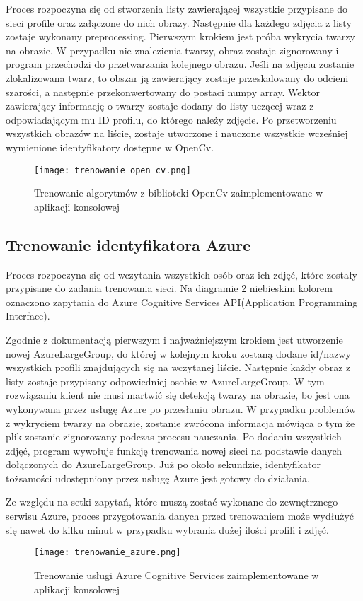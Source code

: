 Proces rozpoczyna się od stworzenia listy zawierającej wszystkie przypisane do sieci profile oraz załączone do nich obrazy. Następnie dla każdego zdjęcia z listy zostaje wykonany preprocessing. Pierwszym krokiem jest próba wykrycia twarzy na obrazie. W przypadku nie znalezienia twarzy, obraz zostaje zignorowany i program przechodzi do przetwarzania kolejnego obrazu. Jeśli na zdjęciu zostanie zlokalizowana twarz, to obszar ją zawierający zostaje przeskalowany do odcieni szarości, a następnie przekonwertowany do postaci numpy array. Wektor zawierający informację o twarzy zostaje dodany do listy uczącej wraz z odpowiadającym mu ID profilu, do którego należy zdjęcie. Po przetworzeniu wszystkich obrazów na liście, zostaje utworzone i nauczone wszystkie wcześniej wymienione identyfikatory dostępne w OpenCv.
\begin{figure}[H]
	\centering
	\texttt{[image: trenowanie\_open\_cv.png]}
	\caption{Trenowanie algorytmów z biblioteki OpenCv zaimplementowane w aplikacji konsolowej}
	\label{fig:trenowanie_open_cv}
\end{figure}

\subsection{Trenowanie identyfikatora Azure} \label{trenowanie_azure}
Proces rozpoczyna się od wczytania wszystkich osób oraz ich zdjęć, które zostały przypisane do zadania trenowania sieci. Na diagramie \ref{fig:trenowanie_azure} niebieskim kolorem oznaczono zapytania do Azure Cognitive Services API(Application Programming Interface).

Zgodnie z dokumentacją \cite{acs_doc} pierwszym i najważniejszym krokiem jest utworzenie nowej AzureLargeGroup, do której w kolejnym kroku zostaną dodane id/nazwy wszystkich profili znajdujących się na wczytanej liście.  Następnie każdy obraz z listy zostaje przypisany odpowiedniej osobie w AzureLargeGroup. W tym rozwiązaniu klient nie musi martwić się detekcją twarzy na obrazie, bo jest ona wykonywana przez usługę Azure po przesłaniu obrazu. W przypadku problemów z wykryciem twarzy na obrazie, zostanie zwrócona informacja mówiąca o tym że plik zostanie zignorowany podczas procesu nauczania. Po dodaniu wszystkich zdjęć, program wywołuje funkcję trenowania nowej sieci na podstawie danych dołączonych do AzureLargeGroup. Już po około sekundzie, identyfikator tożsamości udostępniony przez usługę Azure jest gotowy do działania.

Ze względu na setki zapytań, które muszą zostać wykonane do zewnętrznego serwisu Azure, proces przygotowania danych przed trenowaniem może wydłużyć się nawet do kilku minut w przypadku wybrania dużej ilości profili i zdjęć.
\begin{figure}[H]
	\centering
	\texttt{[image: trenowanie\_azure.png]}
	\caption{Trenowanie usługi Azure Cognitive Services zaimplementowane w aplikacji konsolowej}
	\label{fig:trenowanie_azure}
\end{figure}

